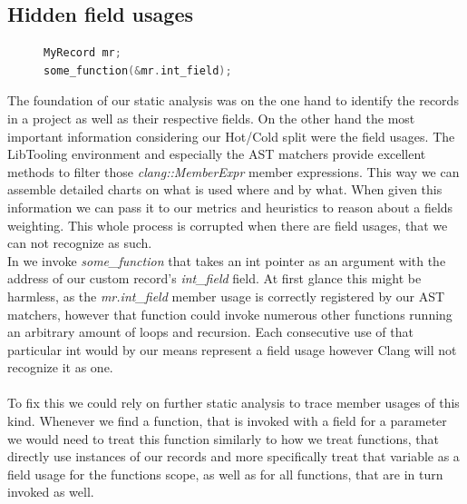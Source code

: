 \subsection{Hidden field usages}\label{hidden_field_usages}
\begin{figure}
\vspace{-20pt}
\begin{lstlisting}[language=C++,name={Simple example of how to hide a field usage from the LibTooling API},label={hidden_field_usage}]
MyRecord mr;
some_function(&mr.int_field);
\end{lstlisting}
\end{figure}
The foundation of our static analysis was on the one hand to identify the records in a project as well as their respective fields. On the other hand the most important information considering our Hot/Cold split were the field usages. The LibTooling environment and especially the AST matchers provide excellent methods to filter those \textit{clang::MemberExpr} member expressions. This way we can assemble detailed charts on what is used where and by what. When given this information we can pass it to our metrics and heuristics to reason about a fields weighting. This whole process is corrupted when there are field usages, that we can not recognize as such.\\
In  we invoke \textit{some\_function} that takes an int pointer as an argument with the address of our custom record's \textit{int\_field} field. At first glance this might be harmless, as the \textit{mr.int\_field} member usage is correctly registered by our AST matchers, however that function could invoke numerous other functions running an arbitrary amount of loops and recursion. Each consecutive use of that particular int would by our means represent a field usage however Clang will not recognize it as one.\\\\
To fix this we could rely on further static analysis to trace member usages of this kind. Whenever we find a function, that is invoked with a field for a parameter we would need to treat this function similarly to how we treat functions, that directly use instances of our records and more specifically treat that variable as a field usage for the functions scope, as well as for all functions, that are in turn invoked as well.

